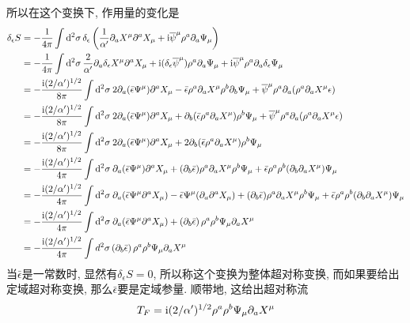 所以在这个变换下, 作用量的变化是\begin{align*}
\delta _{\epsilon }S &=-\frac{1}{4\pi }\int \dif^{2}\sigma\, \delta _{\epsilon
}\left( \frac{1}{\alpha ^{\prime }}\partial _{a}X^{\mu }\partial ^{a}X_{\mu
}+\mi\overline{\psi}^{\mu }\rho ^{a}\partial _{a}\Psi _{\mu }\right)  \\
&=-\frac{1}{4\pi }\int \dif^{2}\sigma\, \frac{2}{\alpha ^{\prime }}\partial
_{a}\delta _{\epsilon }X^{\mu }\partial ^{a}X_{\mu }+\mi(\delta _{\epsilon }%
\overline{\psi}^{\mu })\rho ^{a}\partial _{a}\Psi _{\mu }+\mi\overline{\psi}^{\mu }\rho
^{a}\partial _{a}\delta _{\epsilon }\Psi _{\mu } \\
&=-\frac{\mi(2/\alpha ^{\prime })^{1/2}}{8\pi }\int \dif^{2}\sigma\: 2\partial
_{a}(\bar{\epsilon}\Psi ^{\mu }) \partial ^{a}X_{\mu }-\bar{%
\epsilon}\rho ^{a}\partial _{a}X^{\mu }\rho ^{b}\partial _{b}\Psi _{\mu }+%
\overline{\psi}^{\mu }\rho ^{a}\partial _{a}( \rho ^{a}\partial _{a}X^{\mu
}\epsilon)  \\
&=-\frac{\mi(2/\alpha ^{\prime })^{1/2}}{8\pi }\int \dif^{2}\sigma\:2\partial
_{a}( \bar{\epsilon}\Psi ^{\mu }) \partial ^{a}X_{\mu }+\partial
_{b}( \bar{\epsilon}\rho ^{a}\partial _{a}X^{\mu }) \rho ^{b}\Psi
_{\mu }+\overline{\psi}^{\mu }\rho ^{a}\partial _{a}( \rho ^{a}\partial
_{a}X^{\mu }\epsilon )  \\
&=-\frac{\mi(2/\alpha ^{\prime })^{1/2}}{8\pi }\int \dif^{2}\sigma \:2\partial
_{a}(\bar{\epsilon}\Psi ^{\mu }) \partial ^{a}X_{\mu }+2\partial
_{b}(\bar{\epsilon}\rho ^{a}\partial _{a}X^{\mu }) \rho ^{b}\Psi
_{\mu } \\
&=-\frac{\mi(2/\alpha ^{\prime })^{1/2}}{4\pi }\int \dif^{2}\sigma\: \partial
_{a}(\bar{\epsilon}\Psi ^{\mu }) \partial ^{a}X_{\mu }+(
\partial _{b}\bar{\epsilon}) \rho ^{a}\partial _{a}X^{\mu }\rho
^{b}\Psi _{\mu }+\bar{\epsilon}\rho ^{a}\rho ^{b}(\partial
_{b}\partial _{a}X^{\mu }) \Psi _{\mu } \\
&=-\frac{\mi(2/\alpha ^{\prime })^{1/2}}{4\pi }\int \dif^{2}\sigma\: \partial
_{a}( \bar{\epsilon}\Psi ^{\mu }\partial ^{a}X_{\mu }) -\bar{%
\epsilon}\Psi ^{\mu }( \partial _{a}\partial ^{a}X_{\mu })
+( \partial _{b}\bar{\epsilon}) \rho ^{a}\partial _{a}X^{\mu
}\rho ^{b}\Psi _{\mu }+\bar{\epsilon}\rho ^{a}\rho ^{b}( \partial
_{b}\partial _{a}X^{\mu }) \Psi _{\mu } \\
&=-\frac{\mi(2/\alpha ^{\prime })^{1/2}}{4\pi }\int \dif^{2}\sigma\: \partial
_{a}( \bar{\epsilon}\Psi ^{\mu }\partial ^{a}X_{\mu }) +\left(
\partial _{b}\bar{\epsilon}\right) \rho ^{a}\rho ^{b}\Psi _{\mu }\partial
_{a}X^{\mu } \\
&=-\frac{\mi(2/\alpha ^{\prime })^{1/2}}{4\pi }\int d^{2}\sigma \left(
\partial _{b}\bar{\epsilon}\right) \rho ^{a}\rho ^{b}\Psi _{\mu }\partial
_{a}X^{\mu }
\end{align*}
当$\bar{\epsilon}$是一常数时, 显然有$\delta_{\epsilon}S=0$, 所以称这个变换为整体超对称变换, 而如果要给出定域超对称变换, 那么$\bar{\epsilon}$要是定域参量. 顺带地, 这给出超对称流
\[
T_{F}=\mathrm{i}(2/\alpha ^{\prime })^{1/2} \rho ^{a}\rho ^{b}\Psi _{\mu }\partial_{a}X^{\mu }
\]



